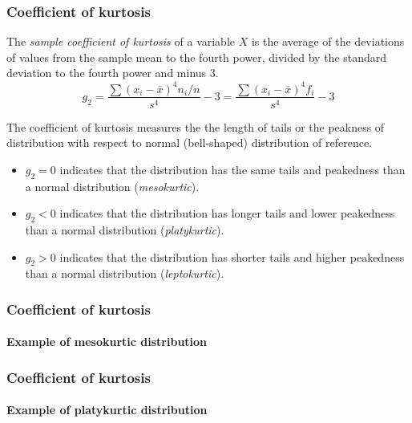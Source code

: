 \begin{frame}
\frametitle{Coefficient of kurtosis}
\begin{definition}
The \emph{sample coefficient of kurtosis} of a variable $X$ is the average of the deviations of values from the sample
mean to the fourth power, divided by the standard deviation to the fourth power and minus 3. 
\[g_2 = \frac{\sum (x_i-\bar x)^4 n_i/n}{s^4}-3 = \frac{\sum (x_i-\bar x)^4 f_i}{s^4}-3\]
\end{definition}

The coefficient of kurtosis measures the the length of tails or the peakness of distribution with respect to normal
(bell-shaped) distribution of reference.
\begin{itemize}
\item $g_2=0$ indicates that the distribution has the same tails and peakedness than a normal distribution
(\emph{mesokurtic}).
\item $g_2<0$ indicates that the distribution has longer tails and lower peakedness than a normal distribution
(\emph{platykurtic}).
\item $g_2>0$ indicates that the distribution has shorter tails and higher peakedness than a normal distribution 
(\emph{leptokurtic}).
\end{itemize}
\end{frame}


\begin{frame}
\frametitle{Coefficient of kurtosis}
\framesubtitle{Example of mesokurtic distribution}
\begin{center}
\scalebox{0.6}{}
\end{center}
\end{frame}


\begin{frame}
\frametitle{Coefficient of kurtosis}
\framesubtitle{Example of platykurtic distribution}
\begin{center}
\scalebox{0.6}{}
\end{center}
\end{frame}


